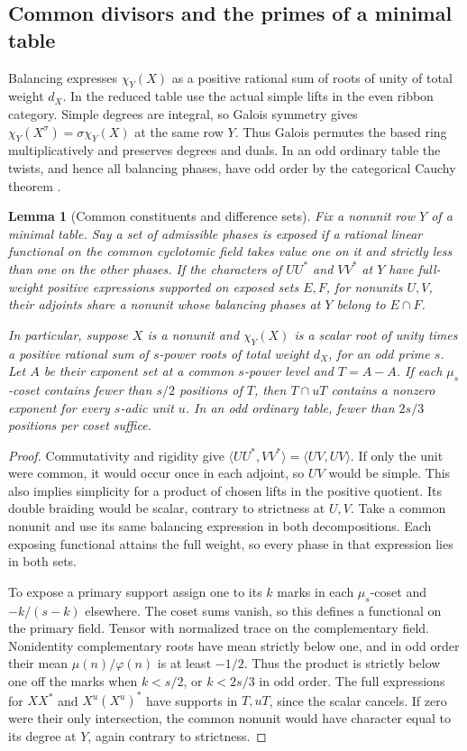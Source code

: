 \documentclass[11pt,a4paper]{article}
\numberwithin{equation}{section}
\newtheorem{lemma}[theorem]{Lemma}
\theoremstyle{remark}
\begin{document}
\subsection{Common divisors and the primes of a minimal table}\label{fam:M:sec:4.5}
Balancing expresses $\chi_Y(X)$ as a positive rational sum of
roots of unity of total weight $d_X$. In the reduced table use the
actual simple lifts in the even ribbon category. Simple degrees
are integral, so Galois symmetry gives
$\chi_Y(X^\sigma)=\sigma\chi_Y(X)$ at the same row $Y$.
Thus Galois permutes the based ring multiplicatively and preserves
degrees and duals. In an odd ordinary table the twists, and hence
all balancing phases, have odd order by the categorical Cauchy
theorem \cite[Theorem~3.9]{BNRWFinite}.

\begin{lemma}[Common constituents and difference sets]\label{fam:Q:2.2}\label{fam:Q:n:lim:diff}
Fix a nonunit row $Y$ of a minimal table. Say a set of admissible phases
is \emph{exposed} if a rational linear functional on the common cyclotomic
field takes value one on it and strictly less than one on the other phases.
If the characters of $UU^*$ and $VV^*$ at $Y$ have full-weight positive
expressions supported on exposed sets $E,F$, for nonunits $U,V$, their
adjoints share a nonunit whose balancing phases at $Y$ belong to $E\cap F$.

In particular, suppose $X$ is a nonunit and $\chi_Y(X)$ is a scalar root
of unity times a positive rational
sum of $s$-power roots of total weight $d_X$, for an odd prime $s$.
Let $A$ be their exponent set at a common $s$-power level and
$T=A-A$. If each $\mu_s$-coset contains fewer than $s/2$ positions
of $T$, then $T\cap uT$ contains a nonzero exponent for every
$s$-adic unit $u$. In an odd ordinary table, fewer than $2s/3$
positions per coset suffice.
\end{lemma}
\begin{proof}
Commutativity and rigidity give
$\langle UU^*,VV^*\rangle=\langle UV,UV\rangle$. If only the unit
were common, it would occur once in each adjoint, so $UV$ would be
simple. This also implies simplicity for a product of chosen lifts in
the positive quotient. Its double braiding would be scalar, contrary
to strictness at $U,V$. Take a common nonunit and use its same
balancing expression in both decompositions. Each exposing functional
attains the full weight, so every phase in that expression lies in
both sets.

To expose a primary support assign one to its $k$ marks in each
$\mu_s$-coset and $-k/(s-k)$ elsewhere. The coset sums vanish, so this
defines a functional on the primary field. Tensor with normalized trace
on the complementary field. Nonidentity complementary roots have mean
strictly below one, and in odd order their mean
$\mu(n)/\varphi(n)$ is at least $-1/2$. Thus the product is strictly
below one off the marks when $k<s/2$, or $k<2s/3$ in odd order.
The full expressions for $XX^*$ and $X^u(X^u)^*$ have supports in
$T,uT$, since the scalar cancels. If zero were their only intersection,
the common nonunit would have character equal to its degree at $Y$,
again contrary to strictness.
\end{proof}
\end{document}

